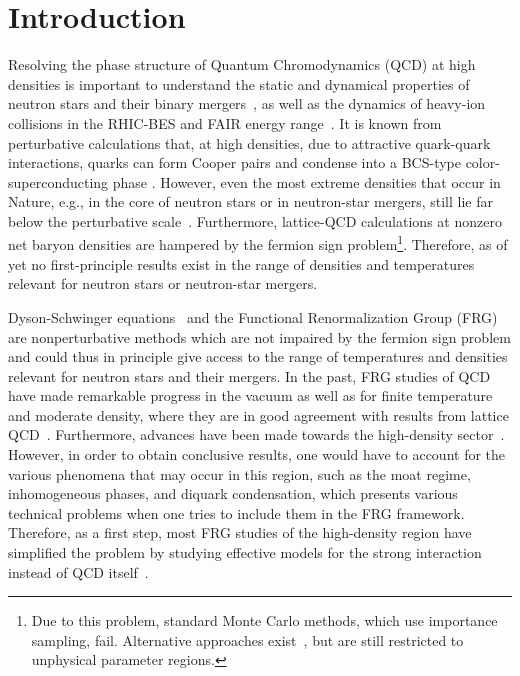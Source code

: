 \documentclass[
onecolumn,
aps,
prd,
amsmath,
amssymb,
nofootinbib
]{revtex4-2}
\begin{document}

\section{\label{sec:level1}Introduction}

Resolving the phase structure of Quantum Chromodynamics (QCD) at high densities is important to understand the static and dynamical properties of neutron stars and their binary mergers~\cite{PhysRevD.67.074024,Most:2018eaw,baym2018hadrons,Annala_2020}, as well as the dynamics of heavy-ion collisions in the RHIC-BES and FAIR energy range~\cite{Chen:2024aom,Messchendorp:2025men}. 
It is known from perturbative calculations that, at high densities, due to attractive quark-quark interactions, quarks can form Cooper pairs and condense into a BCS-type color-superconducting phase \cite{bailin1979superfluid,Schafer:1999jg,Pisarski:1999tv,rischke2004quark,buballa2005njl,Alford:2007xm}. 
However, even the most extreme densities that occur in Nature, e.g., in the core of neutron stars or in neutron-star mergers, still lie far below the perturbative scale~\cite{gorda2026abovebelowassessingextremeness}.
Furthermore, lattice-QCD calculations  at nonzero net baryon densities are hampered by the fermion sign problem\footnote{Due to this problem, standard Monte Carlo methods, which use importance sampling, fail. Alternative approaches exist~\cite{Philipsen:2021vgp}, but are still restricted to unphysical parameter regions.}.
Therefore, as of yet no first-principle results exist in the range of densities and temperatures relevant for neutron stars or neutron-star mergers.


Dyson-Schwinger equations~\cite{Roberts:1994dr,Roberts:2000aa,Fischer:2018sdj} and the Functional Renormalization Group (FRG)~\cite{wetterich1993exact,Pawlowski:2005xe,Dupuis:2020fhh} are nonperturbative methods which are not impaired by the fermion sign problem and could thus in principle give access to the range of temperatures and densities relevant for neutron stars and their mergers.
In the past, FRG studies of QCD have made remarkable progress in the vacuum as well as for finite temperature and moderate density, where they are in good agreement with results from lattice QCD~\cite{Braun:2017srn,Fu:2019hdw}. Furthermore, advances have been made towards the high-density sector~\cite{Braun:2019aow,pawlowski2025inhomogeneousinstabilitieshighdensityqcd,Sattler:2025hcg,Fu:2024rto}.
However, in order to obtain conclusive results, one would have to account for the various phenomena that may occur in this region, such as the moat regime, inhomogeneous phases, and diquark condensation, which presents various technical problems when one tries to include them in the FRG framework.
Therefore, as a first step, most FRG studies of the high-density region have simplified the problem by studying effective models for the strong interaction instead of QCD itself~\cite{Schaefer_2005,Pawlowski:2014zaa,Tripolt_2014,Ihssen:2023xlp,Tripolt:2021jtp,Otto:2020hoz}.
\end{document}
